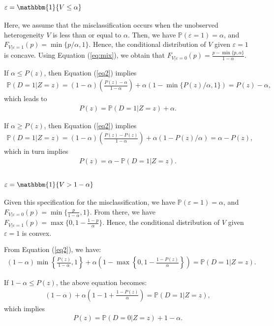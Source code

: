 \documentclass[11pt,reqno]{amsart}
\theoremstyle{plain}
\numberwithin{equation}{section}
\begin{document}
\subsection{$\varepsilon=\mathbbm{1}\{V\leq \alpha\}$} Here, we assume that the misclassification occurs when the unobserved heterogeneity $V$ is less than or equal to $\alpha$. Then, we have $\mathbb P(\varepsilon=1)=\alpha$, and $F_{V\vert \varepsilon=1}(p)=\min\{p/\alpha,1\}$. Hence, the conditional distribution of $V$ given $\varepsilon=1$ is concave. Using Equation (\ref{eq:mix}), we obtain that $F_{V\vert \varepsilon=0}(p)=\frac{p-\min\{p,\alpha\}}{1-\alpha}$. 

If $\alpha \leq P(z)$, then Equation (\ref{eq2}) implies
\begin{eqnarray*}
\mathbb P(D=1\vert Z=z)=(1-\alpha)\left(\frac{P(z)-\alpha}{1-\alpha}\right)+\alpha(1-\min\{P(z)/\alpha,1\})=P(z)-\alpha,
\end{eqnarray*}
which leads to 
\begin{eqnarray}
P(z)=\mathbb P(D=1\vert Z=z)+\alpha.
\end{eqnarray}

If $\alpha \geq P(z)$, then Equation (\ref{eq2}) implies
\begin{eqnarray*}
\mathbb P(D=1\vert Z=z)=(1-\alpha)\left(\frac{P(z)-P(z)}{1-\alpha}\right)+\alpha(1-P(z)/\alpha)=\alpha-P(z),
\end{eqnarray*}
which in turn implies 
\begin{eqnarray}
P(z)=\alpha-\mathbb P(D=1\vert Z=z).
\end{eqnarray}

\subsection{$\varepsilon=\mathbbm{1}\{V> 1-\alpha\}$} Given this specification for the misclassification, we have $\mathbb P(\varepsilon=1)=\alpha$, and $F_{V\vert \varepsilon=0}(p)=\min\{\frac{p}{1-\alpha},1\}$. From there, we have $F_{V\vert \varepsilon=1}(p)=\max\{0,1-\frac{1-p}{\alpha}\}$. Hence, the conditional distribution of $V$ given $\varepsilon=1$ is convex.

From Equation (\ref{eq2}), we have:
\begin{eqnarray*}
(1-\alpha)\min\left\{\frac{P(z)}{1-\alpha},1\right\}+\alpha \left(1-\max\left\{0,1-\frac{1-P(z)}{\alpha}\right\}\right)=\mathbb P(D=1\vert Z=z).
\end{eqnarray*}

If $1-\alpha \leq P(z)$, the above equation becomes:
\begin{eqnarray*}
(1-\alpha)+\alpha \left(1-1+\frac{1-P(z)}{\alpha}\right)=\mathbb P(D=1\vert Z=z),
\end{eqnarray*}
which implies 
\begin{eqnarray}
P(z)=\mathbb P(D=0\vert Z=z)+1-\alpha.
\end{eqnarray}
\end{document}
